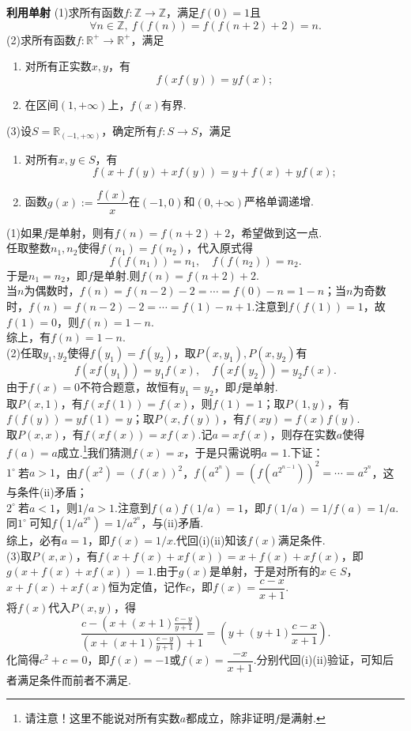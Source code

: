 \documentclass[lang=cn, zihao=5]{elegantbook}
\newcommand{\R}{\mathbb{R}}
\newcommand{\buzhou}[1]{$#1^{\circ} \ $}
\newcommand{\examplefont}[1]{\color{mgreen} \textbf{#1}}
\begin{document}
\begin{example}{\examplefont{利用单射}}
	(1)求所有函数$f:\mathbb{Z} \to \mathbb{Z}$，满足$f(0)=1$且$$\forall n \in \mathbb{Z},~ f(f(n))=f(f(n+2)+2)=n.$$
	(2)求所有函数$f:\R^+ \to \R^+$，满足
	\begin{enumerate}
		\item 对所有正实数$x,y$，有$$f(xf(y))=yf(x);$$
		\item 在区间$(1,+\infty)$上，$f(x)$有界.
	\end{enumerate}
	(3)设$S=\R _{(-1,+\infty )}$，确定所有$f:S \to S$，满足
	\begin{enumerate}
		\item 对所有$x,y \in S$，有$$f(x+f(y)+xf(y))=y+f(x)+yf(x);$$
		\item 函数$g(x):=\dfrac{f(x)}{x}$在$(-1,0)$和$(0,+\infty)$严格单调递增.
	\end{enumerate}
\end{example}
\begin{solution}
	(1)如果$f$是单射，则有$f(n)=f(n+2)+2$，希望做到这一点. \\
	任取整数$n_1,n_2$使得$f(n_1)=f(n_2)$，代入原式得$$f(f(n_1))=n_1,\quad f(f(n_2))=n_2.$$
	于是$n_1=n_2$，即$f$是单射.则$f(n)=f(n+2)+2$. \\
	当$n$为偶数时，$f(n)=f(n-2)-2=\cdots =f(0)-n=1-n$；当$n$为奇数时，$f(n)=f(n-2)-2=\cdots =f(1)-n+1$.注意到$f(f(1))=1$，故$f(1)=0$，则$f(n)=1-n$. \\
	综上，有$f(n)=1-n$. \\
	(2)任取$y_1,y_2$使得$f(y_1)=f(y_2)$，取$P(x,y_1),P(x,y_2)$有$$f(xf(y_1))=y_1f(x),\quad f(xf(y_2))=y_2f(x).$$
	由于$f(x)=0$不符合题意，故恒有$y_1=y_2$，即$f$是单射. \\
	取$P(x,1)$，有$f(xf(1))=f(x)$，则$f(1)=1$；取$P(1,y)$，有$f(f(y))=yf(1)=y$；取$P(x,f(y))$，有$f(xy)=f(x)f(y)$. \\
	取$P(x,x)$，有$f(xf(x))=xf(x)$.记$a=xf(x)$，则存在实数$a$使得$f(a)=a$成立.\footnote{请注意！这里不能说对所有实数$a$都成立，除非证明$f$是满射.}我们猜测$f(x)=x$，于是只需说明$a=1$.下证： \\
	\buzhou{1}若$a>1$，由$f(x^2)=(f(x))^2$，$f(a^{2^n})=(f(a^{2^{n-1}}))^2=\cdots = a^{2^n}$，这与条件(ii)矛盾； \\
	\buzhou{2}若$a<1$，则$1/a>1$.注意到$f(a)f(1/a)=1$，即$f(1/a)=1/f(a)=1/a$.同\buzhou{1}可知$f(1/a^{2^n})=1/a^{2^n}$，与(ii)矛盾. \\
	综上，必有$a=1$，即$f(x)=1/x$.代回(i)(ii)知该$f(x)$满足条件. \\
	(3)取$P(x,x)$，有$f(x+f(x)+xf(x))=x+f(x)+xf(x)$，即$g(x+f(x)+xf(x))=1$.由于$g(x)$是单射，于是对所有的$x \in S$，$x+f(x)+xf(x)$恒为定值，记作$c$，即$f(x)=\dfrac{c-x}{x+1}$. \\
	将$f(x)$代入$P(x,y)$，得$$\frac{c-(x+(x+1)\frac{c-y}{y+1})}{(x+(x+1)\frac{c-y}{y+1})+1} = (y+(y+1)\frac{c-x}{x+1}).$$
	化简得$c^2+c=0$，即$f(x)=-1$或$f(x)=\dfrac{-x}{x+1}$.分别代回(i)(ii)验证，可知后者满足条件而前者不满足.
\end{solution}
\end{document}
